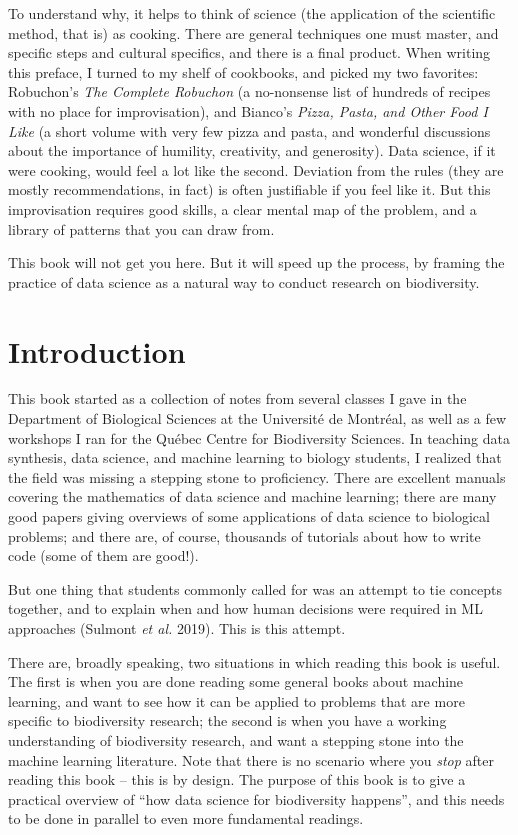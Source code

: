 \documentclass[
  letterpaper,
]{scrbook}
\begin{document}
To understand why, it helps to think of science (the application of the
scientific method, that is) as cooking. There are general techniques one
must master, and specific steps and cultural specifics, and there is a
final product. When writing this preface, I turned to my shelf of
cookbooks, and picked my two favorites: Robuchon's \emph{The Complete
Robuchon} (a no-nonsense list of hundreds of recipes with no place for
improvisation), and Bianco's \emph{Pizza, Pasta, and Other Food I Like}
(a short volume with very few pizza and pasta, and wonderful discussions
about the importance of humility, creativity, and generosity). Data
science, if it were cooking, would feel a lot like the second. Deviation
from the rules (they are mostly recommendations, in fact) is often
justifiable if you feel like it. But this improvisation requires good
skills, a clear mental map of the problem, and a library of patterns
that you can draw from.

This book will not get you here. But it will speed up the process, by
framing the practice of data science as a natural way to conduct
research on biodiversity.


\chapter{Introduction}\label{introduction}

This book started as a collection of notes from several classes I gave
in the Department of Biological Sciences at the Université de Montréal,
as well as a few workshops I ran for the Québec Centre for Biodiversity
Sciences. In teaching data synthesis, data science, and machine learning
to biology students, I realized that the field was missing a stepping
stone to proficiency. There are excellent manuals covering the
mathematics of data science and machine learning; there are many good
papers giving overviews of some applications of data science to
biological problems; and there are, of course, thousands of tutorials
about how to write code (some of them are good!).

But one thing that students commonly called for was an attempt to tie
concepts together, and to explain when and how human decisions were
required in ML approaches (Sulmont \emph{et al.} 2019). This is this
attempt.

There are, broadly speaking, two situations in which reading this book
is useful. The first is when you are done reading some general books
about machine learning, and want to see how it can be applied to
problems that are more specific to biodiversity research; the second is
when you have a working understanding of biodiversity research, and want
a stepping stone into the machine learning literature. Note that there
is no scenario where you \emph{stop} after reading this book -- this is
by design. The purpose of this book is to give a practical overview of
``how data science for biodiversity happens'', and this needs to be done
in parallel to even more fundamental readings.
\end{document}
